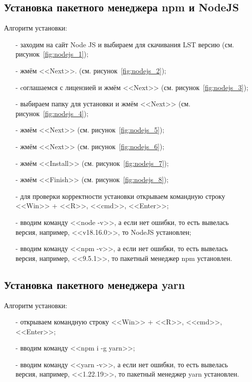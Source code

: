 \subsection{Установка пакетного менеджера npm и NodeJS} \label{sect:npm}

Алгоритм установки:

\begin{enumerate}
    \item[-] заходим на сайт Node JS и выбираем для скачивания LST версию (см. рисунок~\ref{fig:nodejs_1});
    \item[-] жмём <<Next>>. (см. рисунок~\ref{fig:nodejs_2});
    \item[-] cоглашаемся с лицензией и жмём <<Next>> (см. рисунок~\ref{fig:nodejs_3});
    \item[-] выбираем папку для установки и жмём <<Next>> (см. рисунок~\ref{fig:nodejs_4});
    \item[-] жмём <<Next>> (см. рисунок~\ref{fig:nodejs_5});
    \item[-] жмём <<Next>> (см. рисунок~\ref{fig:nodejs_6});
    \item[-] жмём <<Install>> (см. рисунок~\ref{fig:nodejs_7});
    \item[-] жмём <<Finish>> (см. рисунок~\ref{fig:nodejs_8});
    \item[-] для проверки корректности установки открываем командную строку <<Win>> + <<R>>, <<cmd>>, <<Enter>>;
    \item[-] вводим команду <<node -v>>, а если нет ошибки, то есть вывелась версия, например, <<v18.16.0>>, то NodeJS установлен;
    \item[-] вводим команду <<npm -v>>, а если нет ошибки, то есть вывелась версия, например, <<9.5.1>>, то пакетный менеджер npm установлен.
\end{enumerate}

\subsection{Установка пакетного менеджера yarn}

Алгоритм установки:
\begin{enumerate}
    \item[-] открываем командную строку <<Win>> + <<R>>, <<cmd>>, <<Enter>>;
    \item[-] вводим команду <<npm i -g yarn>>;
    \item[-] вводим команду <<yarn -v>>, а если нет ошибки, то есть вывелась версия, например, <<1.22.19>>, то пакетный менеджер yarn установлен.
\end{enumerate}

